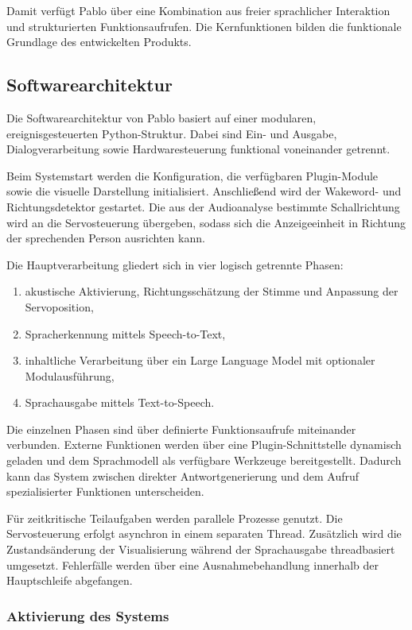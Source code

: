 Damit verfügt Pablo über eine Kombination aus freier sprachlicher Interaktion und strukturierten Funktionsaufrufen. Die Kernfunktionen bilden die funktionale Grundlage des entwickelten Produkts.

\subsection{Softwarearchitektur}

Die Softwarearchitektur von Pablo basiert auf einer modularen, ereignisgesteuerten Python-Struktur. Dabei sind Ein- und Ausgabe, Dialogverarbeitung sowie Hardwaresteuerung funktional voneinander getrennt.

Beim Systemstart werden die Konfiguration, die verfügbaren Plugin-Module sowie die visuelle Darstellung initialisiert. Anschließend wird der Wakeword- und Richtungsdetektor gestartet. Die aus der Audioanalyse bestimmte Schallrichtung wird an die Servosteuerung übergeben, sodass sich die Anzeigeeinheit in Richtung der sprechenden Person ausrichten kann.

Die Hauptverarbeitung gliedert sich in vier logisch getrennte Phasen:
\begin{enumerate}
    \item akustische Aktivierung, Richtungsschätzung der Stimme und Anpassung der Servoposition,
    \item Spracherkennung mittels Speech-to-Text,
    \item inhaltliche Verarbeitung über ein Large Language Model mit optionaler Modulausführung,
    \item Sprachausgabe mittels Text-to-Speech.
\end{enumerate}

Die einzelnen Phasen sind über definierte Funktionsaufrufe miteinander verbunden. Externe Funktionen werden über eine Plugin-Schnittstelle dynamisch geladen und dem Sprachmodell als verfügbare Werkzeuge bereitgestellt. Dadurch kann das System zwischen direkter Antwortgenerierung und dem Aufruf spezialisierter Funktionen unterscheiden.

Für zeitkritische Teilaufgaben werden parallele Prozesse genutzt. Die Servosteuerung erfolgt asynchron in einem separaten Thread. Zusätzlich wird die Zustandsänderung der Visualisierung während der Sprachausgabe threadbasiert umgesetzt. Fehlerfälle werden über eine Ausnahmebehandlung innerhalb der Hauptschleife abgefangen.

\subsubsection{Aktivierung des Systems}

